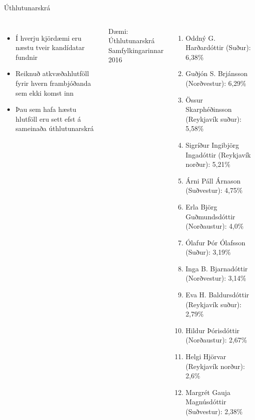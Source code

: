 \documentclass{beamer}
\begin{document}
\begin{frame}{Úthlutunarskrá}
    \begin{columns}
        \begin{itemize}
            \item Í hverju kjördæmi eru næstu tveir kandídatar fundnir
            \item Reiknuð atkvæðahlutföll fyrir hvern frambjóðanda sem ekki komst inn
            \item Þau sem hafa hæstu hlutföll eru sett efst á sameinaða úthlutunarskrá
        \end{itemize}
        Dæmi: Úthlutunarskrá Samfylkingarinnar 2016
        \begin{enumerate}
            \tiny
            \item Oddný G. Harðardóttir (Suður): 6,38\%
            \item Guðjón S. Brjánsson (Norðvestur): 6,29\%
            \item Össur Skarphéðinsson (Reykjavík suður): 5,58\%
            \item Sigríður Ingibjörg Ingadóttir (Reykjavík norður): 5,21\%
            \item Árni Páll Árnason (Suðvestur): 4,75\%
            \item Erla Björg Guðmundsdóttir (Norðaustur): 4,0\%
            \item Ólafur Þór Ólafsson (Suður): 3,19\%
            \item Inga B. Bjarnadóttir (Norðvestur): 3,14\%
            \item Eva H. Baldursdóttir (Reykjavík suður): 2,79\%
            \item Hildur Þórisdóttir (Norðaustur): 2,67\%
            \item Helgi Hjörvar (Reykjavík norður): 2,6\%
            \item Margrét Gauja Magnúsdóttir (Suðvestur): 2,38\%        
        \end{enumerate}
    \end{columns}
\end{frame}
\end{document}

